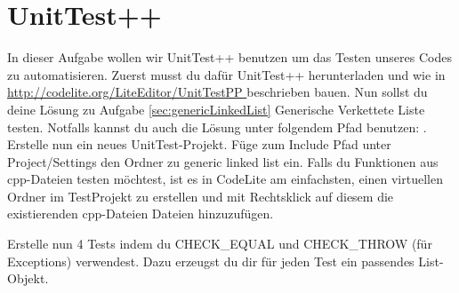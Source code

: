 \section{\ExercisePrefixAdvanced UnitTest++ \optional}\label{sec:unit_test}
\optionaltextbox
{}

In dieser Aufgabe wollen wir UnitTest++ benutzen um das Testen unseres Codes zu automatisieren.
Zuerst musst du dafür UnitTest++ herunterladen und wie in \url{http://codelite.org/LiteEditor/UnitTestPP } beschrieben bauen.
Nun sollst du deine Lösung zu Aufgabe \ref{sec:genericLinkedList} Generische Verkettete Liste testen. 
Notfalls kannst du auch die Lösung unter folgendem Pfad benutzen: . 
Erstelle nun ein neues UnitTest-Projekt. Füge zum Include Pfad unter Project/Settings den Ordner zu generic linked list ein. Falls du Funktionen aus cpp-Dateien testen möchtest, ist es in CodeLite am einfachsten, einen virtuellen Ordner im TestProjekt zu erstellen und mit Rechtsklick auf diesem die existierenden cpp-Dateien Dateien hinzuzufügen.

Erstelle nun 4 Tests indem du CHECK\_EQUAL und CHECK\_THROW (für Exceptions) verwendest. Dazu erzeugst du dir für jeden Test ein passendes List-Objekt.
 
 

